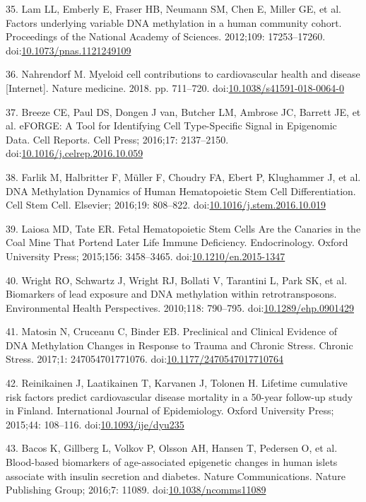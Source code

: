 \documentclass[]{article}
\theoremstyle{definition}
\theoremstyle{definition}
\theoremstyle{definition}
\theoremstyle{remark}
\begin{document}
35. Lam LL, Emberly E, Fraser HB, Neumann SM, Chen E, Miller GE, et al.
Factors underlying variable DNA methylation in a human community cohort.
Proceedings of the National Academy of Sciences. 2012;109: 17253--17260.
doi:\href{http://dx.doi.org/10.1073/pnas.1121249109}{10.1073/pnas.1121249109}

36. Nahrendorf M. Myeloid cell contributions to cardiovascular health
and disease {[}Internet{]}. Nature medicine. 2018. pp. 711--720.
doi:\href{http://dx.doi.org/10.1038/s41591-018-0064-0}{10.1038/s41591-018-0064-0}

37. Breeze CE, Paul DS, Dongen J van, Butcher LM, Ambrose JC, Barrett
JE, et al. eFORGE: A Tool for Identifying Cell Type-Specific Signal in
Epigenomic Data. Cell Reports. Cell Press; 2016;17: 2137--2150.
doi:\href{http://dx.doi.org/10.1016/j.celrep.2016.10.059}{10.1016/j.celrep.2016.10.059}

38. Farlik M, Halbritter F, M{ü}ller F, Choudry FA, Ebert P, Klughammer
J, et al. DNA Methylation Dynamics of Human Hematopoietic Stem Cell
Differentiation. Cell Stem Cell. Elsevier; 2016;19: 808--822.
doi:\href{http://dx.doi.org/10.1016/j.stem.2016.10.019}{10.1016/j.stem.2016.10.019}

39. Laiosa MD, Tate ER. Fetal Hematopoietic Stem Cells Are the Canaries
in the Coal Mine That Portend Later Life Immune Deficiency.
Endocrinology. Oxford University Press; 2015;156: 3458--3465.
doi:\href{http://dx.doi.org/10.1210/en.2015-1347}{10.1210/en.2015-1347}

40. Wright RO, Schwartz J, Wright RJ, Bollati V, Tarantini L, Park SK,
et al. Biomarkers of lead exposure and DNA methylation within
retrotransposons. Environmental Health Perspectives. 2010;118: 790--795.
doi:\href{http://dx.doi.org/10.1289/ehp.0901429}{10.1289/ehp.0901429}

41. Matosin N, Cruceanu C, Binder EB. Preclinical and Clinical Evidence
of DNA Methylation Changes in Response to Trauma and Chronic Stress.
Chronic Stress. 2017;1: 247054701771076.
doi:\href{http://dx.doi.org/10.1177/2470547017710764}{10.1177/2470547017710764}

42. Reinikainen J, Laatikainen T, Karvanen J, Tolonen H. Lifetime
cumulative risk factors predict cardiovascular disease mortality in a
50-year follow-up study in Finland. International Journal of
Epidemiology. Oxford University Press; 2015;44: 108--116.
doi:\href{http://dx.doi.org/10.1093/ije/dyu235}{10.1093/ije/dyu235}

43. Bacos K, Gillberg L, Volkov P, Olsson AH, Hansen T, Pedersen O, et
al. Blood-based biomarkers of age-associated epigenetic changes in human
islets associate with insulin secretion and diabetes. Nature
Communications. Nature Publishing Group; 2016;7: 11089.
doi:\href{http://dx.doi.org/10.1038/ncomms11089}{10.1038/ncomms11089}
\end{document}
